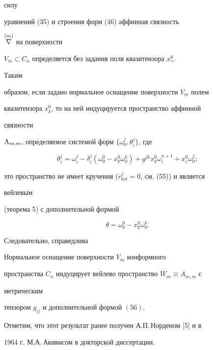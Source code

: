 силу 


уравнений (35) и строения форм (46) аффинная связность 


$\overset{(m)}{\nabla}{}$ на поверхности 


$V_m\subset C_n$ определяется без задания поля квазитензора $x^0_\gamma$. 


Таким 


образом, если задано нормальное оснащение поверхности $V_m$ полем 


квазитензора $x^0_k$, то на ней индуцируется пространство аффинной 


связности 


$\mathrm{A}_{m,m}$, определяемое системой форм $\{\omega^j_0,\theta^j_i\}$, где 


$$ 


\theta^j_i=\omega^j_i-\delta^j_i(\omega^0_0- 


x^0_k\omega^k_0)+g^{j k}x^0_k\omega^{n+1}_i+ 


x^0_i \omega^j_0; 


$$ 


это пространство не имеет кручения ($r^j_{0s t}=0$, см. (55)) и является 


вейлевым 


(теорема 5) с дополнительной формой 


\begin{equation} 


\theta=\omega^0_0-x^0_k\omega^k_0. 


\end{equation} 


Следовательно, справедлива 


 


\begin{thm} 


Нормальное оснащение поверхности $V_m$ конформного 


пространства $C_n$ индуцирует вейлево пространство $W_m\equiv A_{m,m}$ с 


метрическим 


тензором $g_{ij}$ и дополнительной формой $(56)$. 


\end{thm} 


 


Отметим, что этот результат ранее получен А.П.\,Норденом [5] и в 


1964 г. М.А.\,Акивисом в докторской диссертации. 


